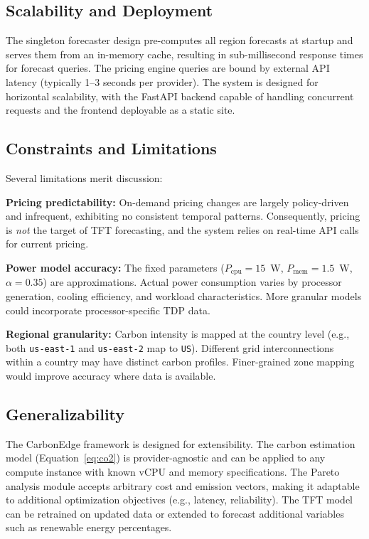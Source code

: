 \documentclass[12pt]{article}
\begin{document}
\subsection{Scalability and Deployment}

The singleton forecaster design pre-computes all region forecasts at startup and serves them from an in-memory cache, resulting in sub-millisecond response times for forecast queries. The pricing engine queries are bound by external API latency (typically 1--3 seconds per provider). The system is designed for horizontal scalability, with the FastAPI backend capable of handling concurrent requests and the frontend deployable as a static site.

\subsection{Constraints and Limitations}

Several limitations merit discussion:

\textbf{Pricing predictability:} On-demand pricing changes are largely policy-driven and infrequent, exhibiting no consistent temporal patterns. Consequently, pricing is \textit{not} the target of TFT forecasting, and the system relies on real-time API calls for current pricing.

\textbf{Power model accuracy:} The fixed parameters ($P_{\text{cpu}} = 15$~W, $P_{\text{mem}} = 1.5$~W, $\alpha = 0.35$) are approximations. Actual power consumption varies by processor generation, cooling efficiency, and workload characteristics. More granular models could incorporate processor-specific TDP data.

\textbf{Regional granularity:} Carbon intensity is mapped at the country level (e.g., both \texttt{us-east-1} and \texttt{us-east-2} map to \texttt{US}). Different grid interconnections within a country may have distinct carbon profiles. Finer-grained zone mapping would improve accuracy where data is available.


\subsection{Generalizability}

The CarbonEdge framework is designed for extensibility. The carbon estimation model (Equation~\ref{eq:co2}) is provider-agnostic and can be applied to any compute instance with known vCPU and memory specifications. The Pareto analysis module accepts arbitrary cost and emission vectors, making it adaptable to additional optimization objectives (e.g., latency, reliability). The TFT model can be retrained on updated data or extended to forecast additional variables such as renewable energy percentages.
\end{document}
